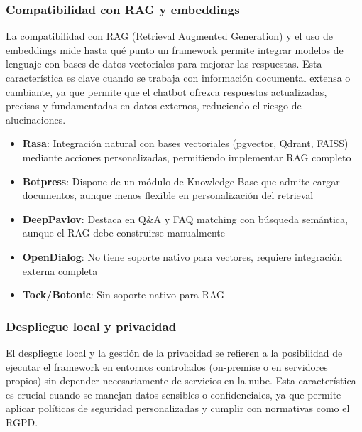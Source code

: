\subsubsection{Compatibilidad con RAG y embeddings}

La compatibilidad con RAG (Retrieval Augmented Generation) y el uso de embeddings mide hasta qué punto un framework permite integrar modelos de lenguaje con bases de datos vectoriales para mejorar las respuestas. Esta característica es clave cuando se trabaja con información documental extensa o cambiante, ya que permite que el chatbot ofrezca respuestas actualizadas, precisas y fundamentadas en datos externos, reduciendo el riesgo de alucinaciones.

\begin{itemize}
    \item \textbf{Rasa}: Integración natural con bases vectoriales (pgvector, Qdrant, FAISS) mediante acciones personalizadas, permitiendo implementar RAG completo
    \item \textbf{Botpress}: Dispone de un módulo de Knowledge Base que admite cargar documentos, aunque menos flexible en personalización del retrieval
    \item \textbf{DeepPavlov}: Destaca en Q\&A y FAQ matching con búsqueda semántica, aunque el RAG debe construirse manualmente
    \item \textbf{OpenDialog}: No tiene soporte nativo para vectores, requiere integración externa completa
    \item \textbf{Tock/Botonic}: Sin soporte nativo para RAG
\end{itemize}

\subsubsection{Despliegue local y privacidad}

El despliegue local y la gestión de la privacidad se refieren a la posibilidad de ejecutar el framework en entornos controlados (on-premise o en servidores propios) sin depender necesariamente de servicios en la nube. Esta característica es crucial cuando se manejan datos sensibles o confidenciales, ya que permite aplicar políticas de seguridad personalizadas y cumplir con normativas como el RGPD.

